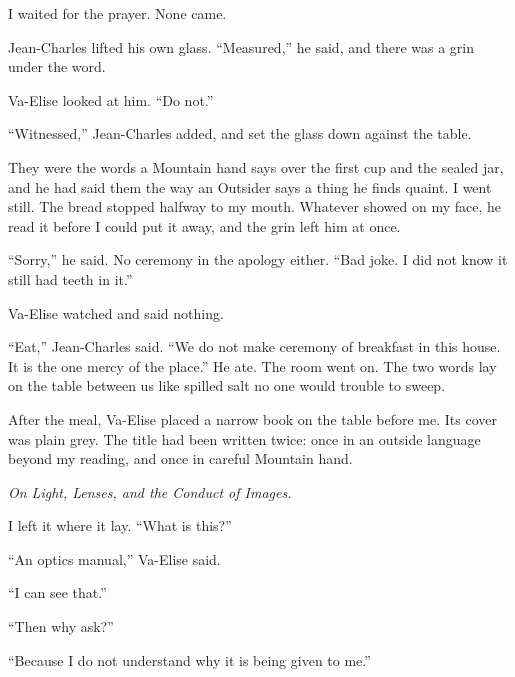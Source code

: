 I waited for the prayer. None came.\par

Jean-Charles lifted his own glass. ``Measured,'' he said, and there was a grin under the word.\par

Va-Elise looked at him. ``Do not.''\par

``Witnessed,'' Jean-Charles added, and set the glass down against the table.\par

They were the words a Mountain hand says over the first cup and the sealed jar, and he had said them the way an Outsider says a thing he finds quaint. I went still. The bread stopped halfway to my mouth. Whatever showed on my face, he read it before I could put it away, and the grin left him at once.\par

``Sorry,'' he said. No ceremony in the apology either. ``Bad joke. I did not know it still had teeth in it.''\par

Va-Elise watched and said nothing.\par

``Eat,'' Jean-Charles said. ``We do not make ceremony of breakfast in this house. It is the one mercy of the place.'' He ate. The room went on. The two words lay on the table between us like spilled salt no one would trouble to sweep.\par

After the meal, Va-Elise placed a narrow book on the table before me. Its cover was plain grey. The title had been written twice: once in an outside language beyond my reading, and once in careful Mountain hand.\par

\textit{On Light, Lenses, and the Conduct of Images.}\par

I left it where it lay. ``What is this?''\par

``An optics manual,'' Va-Elise said.\par

``I can see that.''\par

``Then why ask?''\par

``Because I do not understand why it is being given to me.''\par

